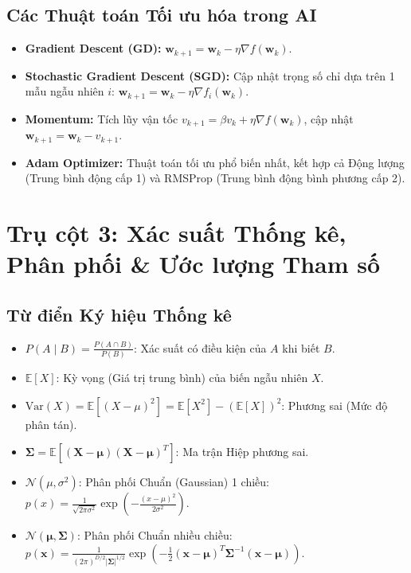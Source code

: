 \documentclass[11pt,a4paper]{article}
\begin{document}
\subsection{Các Thuật toán Tối ưu hóa trong AI}
\begin{itemize}
    \item \textbf{Gradient Descent (GD):} $\mathbf{w}_{k+1} = \mathbf{w}_k - \eta \nabla f(\mathbf{w}_k)$.
    \item \textbf{Stochastic Gradient Descent (SGD):} Cập nhật trọng số chỉ dựa trên 1 mẫu ngẫu nhiên $i$: $\mathbf{w}_{k+1} = \mathbf{w}_k - \eta \nabla f_i(\mathbf{w}_k)$.
    \item \textbf{Momentum:} Tích lũy vận tốc $v_{k+1} = \beta v_k + \eta \nabla f(\mathbf{w}_k)$, cập nhật $\mathbf{w}_{k+1} = \mathbf{w}_k - v_{k+1}$.
    \item \textbf{Adam Optimizer:} Thuật toán tối ưu phổ biến nhất, kết hợp cả Động lượng (Trung bình động cấp 1) và RMSProp (Trung bình động bình phương cấp 2).
\end{itemize}

\newpage
\section{Trụ cột 3: Xác suất Thống kê, Phân phối \& Ước lượng Tham số}

\subsection{Từ điển Ký hiệu Thống kê}
\begin{symbolbox}
\begin{itemize}
    \item $P(A \mid B) = \frac{P(A \cap B)}{P(B)}$: Xác suất có điều kiện của $A$ khi biết $B$.
    \item $\mathbb{E}[X]$: Kỳ vọng (Giá trị trung bình) của biến ngẫu nhiên $X$.
    \item $\text{Var}(X) = \mathbb{E}[(X - \mu)^2] = \mathbb{E}[X^2] - (\mathbb{E}[X])^2$: Phương sai (Mức độ phân tán).
    \item $\mathbf{\Sigma} = \mathbb{E}[(\mathbf{X} - \boldsymbol{\mu})(\mathbf{X} - \boldsymbol{\mu})^T]$: Ma trận Hiệp phương sai.
    \item $\mathcal{N}(\mu, \sigma^2)$: Phân phối Chuẩn (Gaussian) 1 chiều: $p(x) = \frac{1}{\sqrt{2\pi\sigma^2}} \exp\left( -\frac{(x - \mu)^2}{2\sigma^2} \right)$.
    \item $\mathcal{N}(\boldsymbol{\mu}, \mathbf{\Sigma})$: Phân phối Chuẩn nhiều chiều: $p(\mathbf{x}) = \frac{1}{(2\pi)^{D/2} |\mathbf{\Sigma}|^{1/2}} \exp\left( -\frac{1}{2} (\mathbf{x} - \boldsymbol{\mu})^T \mathbf{\Sigma}^{-1} (\mathbf{x} - \boldsymbol{\mu}) \right)$.
\end{itemize}
\end{symbolbox}
\end{document}
